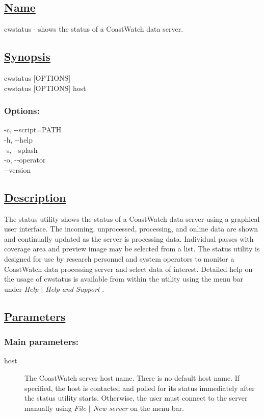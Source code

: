 \subsection*{\underline{Name}}


   cwstatus - shows the status of a CoastWatch data server.  
\subsection*{\underline{Synopsis}}


  cwstatus [OPTIONS] \\ 
 cwstatus [OPTIONS] host 
\subsubsection*{Options:}


  -c, -{-}script=PATH \\ 
 -h, -{-}help \\ 
 -s, -{-}splash \\ 
 -o, -{-}operator \\ 
 -{-}version \\ 

\subsection*{\underline{Description}}


  The status utility shows the status of a CoastWatch data server using a graphical user interface. The incoming, unprocessed, processing, and online data are shown and continually updated as the server is processing data. Individual passes with coverage area and preview image may be selected from a list. The status utility is designed for use by research personnel and system operators to monitor a CoastWatch data processing server and select data of interest. Detailed help on the usage of cwstatus is available from within the utility using the menu bar under \emph{Help $|$ Help and Support}
.
\subsection*{\underline{Parameters}}
\subsubsection*{Main parameters:}
\begin{description}
\item[ host ] The CoastWatch server host name. There is no default host name. If specified, the host is contacted and polled for its status immediately after the status utility starts. Otherwise, the user must connect to the server manually using \emph{File $|$ New server}
 on the menu bar. 

\end{description}
